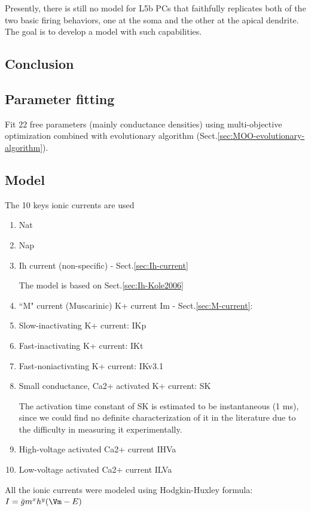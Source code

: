 Presently, there is still no model for L5b PCs that faithfully replicates both
of the two basic firing behaviors, one at the soma and the other at the apical
dendrite. The goal is to develop a model with such capabilities.

\subsection{Conclusion}


\subsection{Parameter fitting}

Fit 22 free parameters (mainly conductance densities) using multi-objective
optimization combined with evolutionary algorithm
(Sect.\ref{sec:MOO-evolutionary-algorithm}). 


\subsection{Model}

The 10 keys ionic currents are used
\begin{enumerate}
  \item Nat
  \item Nap
  \item Ih current (non-specific) - Sect.\ref{sec:Ih-current}

The model is based on Sect.\ref{sec:Ih-Kole2006}  
  
  \item ``M" current (Muscarinic) K+ current Im - Sect.\ref{sec:M-current}:
   
  \item Slow-inactivating K+ current: IKp
  \item Fast-inactivating K+ current: IKt
  \item Fast-noniactivating K+ current: IKv3.1
  \item Small conductance, Ca2+ activated K+ current: SK
  
The activation time constant of SK is estimated to be instantaneous (1 ms),
since we could find no definite characterization of it in the literature due to
the difficulty in measuring it experimentally.

  \item High-voltage activated Ca2+ current IHVa
  \item Low-voltage activated Ca2+ current ILVa
\end{enumerate}
All the ionic currents were modeled using Hodgkin-Huxley formula:
$I = \bar{g}m^x h^y (\Vm - E)$

